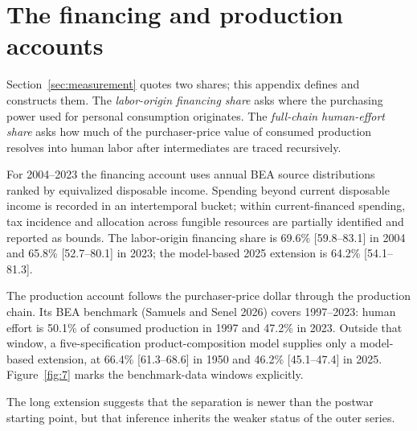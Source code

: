 \documentclass[12pt]{article}
\theoremstyle{plain}
\theoremstyle{definition}
\theoremstyle{remark}
\begin{document}
\section{The financing and production accounts}\label{app:F}

Section~\ref{sec:measurement} quotes two shares; this appendix defines and constructs them. The \emph{labor-origin financing share} asks where the purchasing power used for personal consumption originates. The \emph{full-chain human-effort share} asks how much of the purchaser-price value of consumed production resolves into human labor after intermediates are traced recursively.

For 2004--2023 the financing account uses annual BEA source distributions ranked by equivalized disposable income. Spending beyond current disposable income is recorded in an intertemporal bucket; within current-financed spending, tax incidence and allocation across fungible resources are partially identified and reported as bounds. The labor-origin financing share is 69.6\% [59.8--83.1] in 2004 and 65.8\% [52.7--80.1] in 2023; the model-based 2025 extension is 64.2\% [54.1--81.3].

The production account follows the purchaser-price dollar through the production chain. Its BEA benchmark (Samuels and Senel 2026) covers 1997--2023: human effort is 50.1\% of consumed production in 1997 and 47.2\% in 2023. Outside that window, a five-specification product-composition model supplies only a model-based extension, at 66.4\% [61.3--68.6] in 1950 and 46.2\% [45.1--47.4] in 2025. Figure~\ref{fig:7} marks the benchmark-data windows explicitly.

The long extension suggests that the separation is newer than the postwar starting point, but that inference inherits the weaker status of the outer series.
\end{document}
